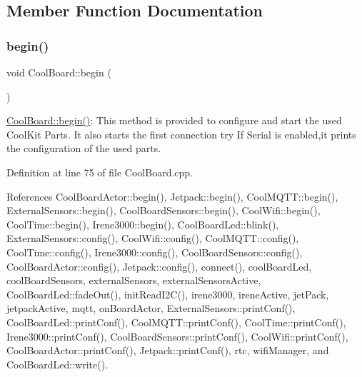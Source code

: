 \subsection{Member Function Documentation}
\mbox{\label{class_cool_board_acba7c5aef7268b2c0044bdb54d3b9d76}} 
\subsubsection{\texorpdfstring{begin()}{begin()}}
{\footnotesize\ttfamily void Cool\+Board\+::begin (\begin{DoxyParamCaption}{ }\end{DoxyParamCaption})}

\hyperlink{class_cool_board_acba7c5aef7268b2c0044bdb54d3b9d76}{Cool\+Board\+::begin()}\+: This method is provided to configure and start the used Cool\+Kit Parts. It also starts the first connection try If Serial is enabled,it prints the configuration of the used parts. 

Definition at line 75 of file Cool\+Board.\+cpp.



References Cool\+Board\+Actor\+::begin(), Jetpack\+::begin(), Cool\+M\+Q\+T\+T\+::begin(), External\+Sensors\+::begin(), Cool\+Board\+Sensors\+::begin(), Cool\+Wifi\+::begin(), Cool\+Time\+::begin(), Irene3000\+::begin(), Cool\+Board\+Led\+::blink(), External\+Sensors\+::config(), Cool\+Wifi\+::config(), Cool\+M\+Q\+T\+T\+::config(), Cool\+Time\+::config(), Irene3000\+::config(), Cool\+Board\+Sensors\+::config(), Cool\+Board\+Actor\+::config(), Jetpack\+::config(), connect(), cool\+Board\+Led, cool\+Board\+Sensors, external\+Sensors, external\+Sensors\+Active, Cool\+Board\+Led\+::fade\+Out(), init\+Read\+I2\+C(), irene3000, irene\+Active, jet\+Pack, jetpack\+Active, mqtt, on\+Board\+Actor, External\+Sensors\+::print\+Conf(), Cool\+Board\+Led\+::print\+Conf(), Cool\+M\+Q\+T\+T\+::print\+Conf(), Cool\+Time\+::print\+Conf(), Irene3000\+::print\+Conf(), Cool\+Board\+Sensors\+::print\+Conf(), Cool\+Wifi\+::print\+Conf(), Cool\+Board\+Actor\+::print\+Conf(), Jetpack\+::print\+Conf(), rtc, wifi\+Manager, and Cool\+Board\+Led\+::write().

